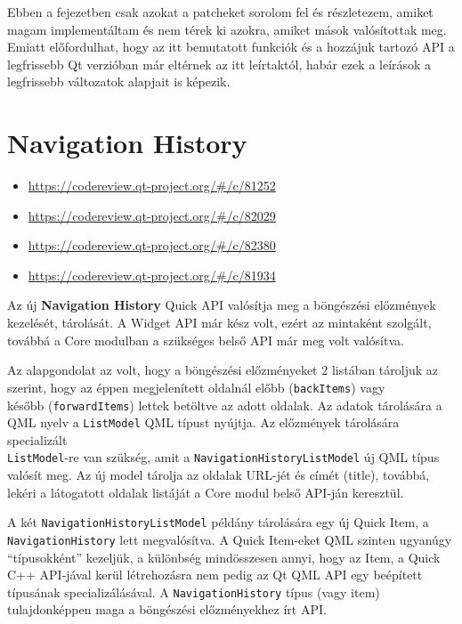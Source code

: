 \documentclass[12pt]{report}
\let\origurl\url
\renewcommand{\url}[1]{%
    \textcolor{blue}{\origurl{#1}}
}
\newcommand{\gerrit}[1]{%
    \textcolor{qtgreen}{\origurl{https://codereview.qt-project.org/\#/c/#1}}
}
\begin{document}
Ebben a fejezetben csak azokat a patcheket sorolom fel és részletezem, amiket magam
implementáltam és nem térek ki azokra, amiket mások valósítottak meg. Emiatt előfordulhat,
hogy az itt bemutatott funkciók és a hozzájuk tartozó API a legfrissebb Qt verzióban
már eltérnek az itt leírtaktól, habár ezek a leírások a legfrissebb változatok alapjait
is képezik.

\section{Navigation History}

\begin{center}
    \begin{reviewbox}
        \begin{itemize}
            \renewcommand{\labelitemi}{\textcolor{qtgreen}{$\blacktriangleright$}}
            \item \gerrit{81252}
            \item \gerrit{82029}
            \item \gerrit{82380}
            \item \gerrit{81934}
        \end{itemize}
    \end{reviewbox}
\end{center}

\noindent
Az új \textbf{Navigation History} Quick API valósítja meg a böngészési előzmények kezelését,
tárolását. A Widget API már kész volt, ezért az mintaként szolgált, továbbá a Core modulban
a szükséges belső API már meg volt valósítva.

Az alapgondolat az volt, hogy a böngészési előzményeket 2 listában tároljuk az szerint,
hogy az éppen megjelenített oldalnál előbb (\texttt{backItems}) vagy \\
később (\texttt{forwardItems}) lettek betöltve az adott oldalak. Az adatok tárolására
a QML nyelv a \texttt{ListModel} QML típust nyújtja. Az előzmények tárolására specializált \\
\texttt{ListModel}-re van szükség, amit a \texttt{NavigationHistoryListModel} új QML típus
valósít meg. Az új model tárolja az oldalak URL-jét és címét (title), továbbá, lekéri
a látogatott oldalak listáját a Core modul belső API-ján keresztül.

A két \texttt{NavigationHistoryListModel} példány tárolására
egy új Quick Item, a \texttt{NavigationHistory} lett megvalósítva. A Quick Item-eket QML
szinten ugyanúgy ``típusokként'' kezeljük, a különbség mindösszesen annyi, hogy az Item,
a Quick C++ API-jával kerül létrehozásra nem pedig az Qt QML API egy beépített típusának
specializálásával. A \texttt{NavigationHistory} típus (vagy item) tulajdonképpen maga a
böngészési előzményekhez írt API.
\end{document}
